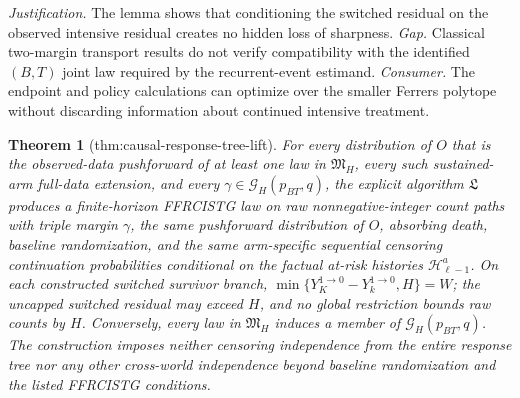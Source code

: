 \documentclass{article}
\newtheorem{theorem}{Theorem}
\begin{document}
\par\smallskip\noindent \textit{Justification.} The lemma shows that conditioning the switched residual on the observed intensive residual creates no hidden loss of sharpness. \textit{Gap.} Classical two-margin transport results do not verify compatibility with the identified \((B,T)\) joint law required by the recurrent-event estimand. \textit{Consumer.} The endpoint and policy calculations can optimize over the smaller Ferrers polytope without discarding information about continued intensive treatment.

\begin{theorem}[thm:causal-response-tree-lift]\label{thm:causal-response-tree-lift}
For every distribution of \(O\) that is the observed-data pushforward of at least one law in \(\mathfrak M_H\), every such sustained-arm full-data extension, and every \(\gamma\in\mathcal G_H(p_{BT},q)\), the explicit algorithm \(\mathfrak L\) produces a finite-horizon FFRCISTG law on raw nonnegative-integer count paths with triple margin \(\gamma\), the same pushforward distribution of \(O\), absorbing death, baseline randomization, and the same arm-specific sequential censoring continuation probabilities conditional on the factual at-risk histories \(\mathcal H_{\ell-1}^a\). On each constructed switched survivor branch, \(\min\{Y_K^{1\to0}-Y_k^{1\to0},H\}=W\); the uncapped switched residual may exceed \(H\), and no global restriction bounds raw counts by \(H\). Conversely, every law in \(\mathfrak M_H\) induces a member of \(\mathcal G_H(p_{BT},q)\). The construction imposes neither censoring independence from the entire response tree nor any other cross-world independence beyond baseline randomization and the listed FFRCISTG conditions.
\end{theorem}
\end{document}
